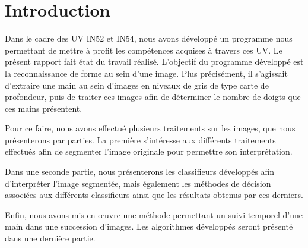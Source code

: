 \section*{Introduction}
Dans le cadre des UV IN52 et IN54, nous avons développé un programme nous permettant de mettre à profit les compétences acquises à travers ces UV. Le présent rapport fait état du travail réalisé. L'objectif du programme développé est la reconnaissance de forme au sein d'une image. Plus précisément, il s'agissait d'extraire une main au sein d'images en niveaux de gris de type carte de profondeur, puis de traiter ces images afin de déterminer le nombre de doigts que ces mains présentent.

Pour ce faire, nous avons effectué plusieurs traitements sur les images, que nous présenterons par parties. La première s’intéresse aux différents traitements effectués afin de segmenter l’image originale pour permettre son interprétation.

Dans une seconde partie, nous présenterons les classifieurs développés afin d’interpréter l’image segmentée, mais également les méthodes de décision associées aux différents classifieurs ainsi que les résultats obtenus par ces derniers.

Enfin, nous avons mis en œuvre une méthode permettant un suivi temporel d’une main dans une succession d’images. Les algorithmes développés seront présenté dans une dernière partie.